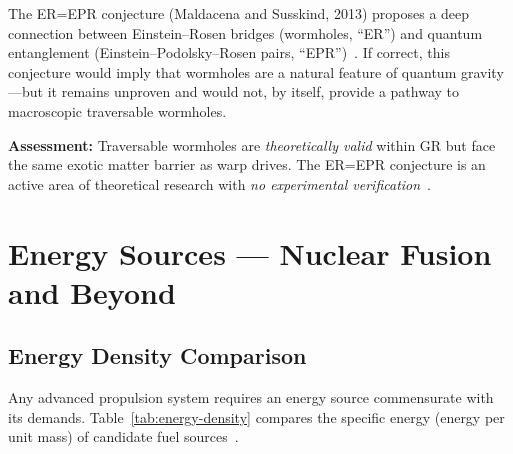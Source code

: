 \documentclass[aps,prd,twocolumn,superscriptaddress,nofootinbib,floatfix]{revtex4-2}
\begin{document}
The ER=EPR conjecture (Maldacena and Susskind, 2013) proposes a deep connection
between Einstein--Rosen bridges (wormholes, ``ER'') and quantum entanglement
(Einstein--Podolsky--Rosen pairs, ``EPR'')~\cite{MaldacenaSusskind2013}. If correct, this
conjecture would imply that wormholes are a natural feature of quantum
gravity---but it remains unproven and would not, by itself, provide a pathway to
macroscopic traversable wormholes.

\textbf{Assessment:} Traversable wormholes are \emph{theoretically valid} within
GR but face the same exotic matter barrier as warp drives. The ER=EPR conjecture
is an active area of theoretical research with \emph{no experimental
verification}~\cite{MorrisThorne1988,MaldacenaSusskind2013,Visser1995}.

\section{Energy Sources --- Nuclear Fusion and Beyond}\label{sec:energy}

\subsection{Energy Density Comparison}\label{sec:energy-density}

Any advanced propulsion system requires an energy source commensurate with its
demands. Table~\ref{tab:energy-density} compares the specific energy (energy per
unit mass) of candidate fuel
sources~\cite{DIRD_Winterberg,DIRD_Teofilo}.
\end{document}
